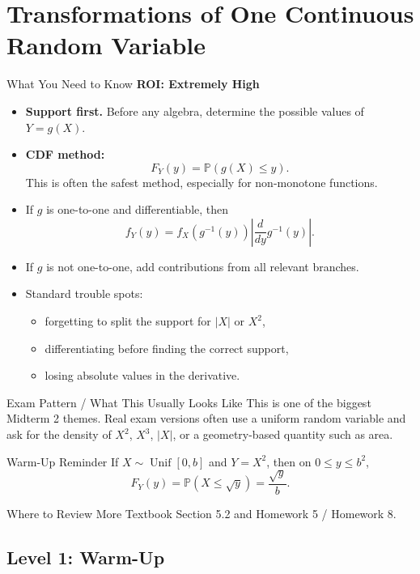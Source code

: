 \documentclass[12pt]{article}
\newcommand{\PP}{\mathbb{P}}
\newcommand{\Unif}{\operatorname{Unif}}
\newcommand{\roiline}[1]{\textbf{ROI: #1}}
\begin{document}
\section{Transformations of One Continuous Random Variable}

\begin{summarybox}{What You Need to Know}
\roiline{Extremely High}
\begin{itemize}
  \item \textbf{Support first.} Before any algebra, determine the possible values of $Y=g(X)$.
  \item \textbf{CDF method:}
  \[
    F_Y(y)=\PP(g(X)\le y).
  \]
  This is often the safest method, especially for non-monotone functions.
  \item If $g$ is one-to-one and differentiable, then
  \[
    f_Y(y)=f_X(g^{-1}(y))\left|\frac{d}{dy}g^{-1}(y)\right|.
  \]
  \item If $g$ is not one-to-one, add contributions from all relevant branches.
  \item Standard trouble spots:
  \begin{itemize}
    \item forgetting to split the support for $|X|$ or $X^2$,
    \item differentiating before finding the correct support,
    \item losing absolute values in the derivative.
  \end{itemize}
\end{itemize}
\end{summarybox}

\begin{patternbox}{Exam Pattern / What This Usually Looks Like}
This is one of the biggest Midterm 2 themes. Real exam versions often use a uniform random variable and ask for the density of $X^2$, $X^3$, $|X|$, or a geometry-based quantity such as area.
\end{patternbox}

\begin{examplebox}{Warm-Up Reminder}
If $X\sim\Unif[0,b]$ and $Y=X^2$, then on $0\le y\le b^2$,
\[
  F_Y(y)=\PP(X\le \sqrt y)=\frac{\sqrt y}{b}.
\]
\end{examplebox}

\begin{reviewbox}{Where to Review More}
Textbook Section 5.2 and Homework 5 / Homework 8.
\end{reviewbox}

\subsection*{Level 1: Warm-Up}
\end{document}
